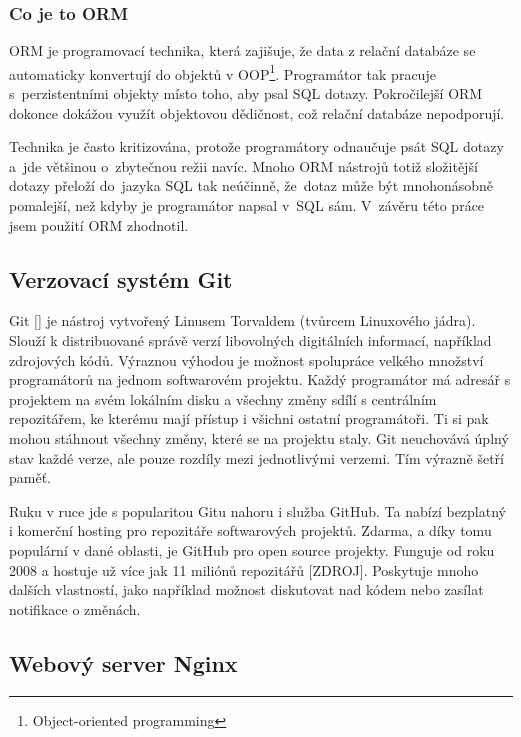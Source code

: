\subsubsection*{Co je to ORM}

ORM je programovací technika, která zajišuje, že data z relační databáze
se automaticky konvertují do objektů v OOP\footnote{Object-oriented programming}. Programátor tak pracuje s~perzistentními
objekty místo toho, aby psal SQL dotazy. Pokročilejší ORM dokonce dokážou využít objektovou dědičnost, což relační databáze nepodporují.

Technika je často kritizována, protože programátory odnaučuje psát SQL dotazy a~jde většinou o~zbytečnou režii navíc.
Mnoho ORM nástrojů totiž složitější dotazy přeloží do~jazyka SQL tak neúčinně,
že~dotaz může být mnohonásobně pomalejší, než kdyby je programátor napsal v~SQL sám.
V~závěru této práce jsem použití ORM zhodnotil.


\subsection{Verzovací systém Git}

Git [] je nástroj vytvořený Linusem Torvaldem (tvůrcem Linuxového jádra).
Slouží k distribuované správě verzí libovolných digitálních informací, například zdrojových kódů.
Výraznou výhodou je možnost spolupráce velkého množství programátorů na jednom softwarovém projektu. 
Každý programátor má adresář s projektem na svém lokálním disku a všechny změny sdílí s centrálním repozitářem,
ke kterému mají přístup i všichni ostatní programátoři. Ti si pak mohou stáhnout všechny změny,
které se na projektu staly. Git neuchovává úplný stav každé verze, ale pouze rozdíly mezi jednotlivými verzemi.
Tím výrazně šetří paměť.  

Ruku v ruce jde s popularitou Gitu nahoru i služba GitHub.
Ta nabízí bezplatný i komerční hosting pro repozitáře softwarových projektů.
Zdarma, a díky tomu populární v dané oblasti, je GitHub pro open source projekty.
Funguje od roku 2008 a hostuje už více jak 11 miliónů repozitářů [ZDROJ].
Poskytuje mnoho dalších vlastností, jako například možnost diskutovat nad kódem
nebo zasílat notifikace o změnách.

\subsection{Webový server Nginx}

